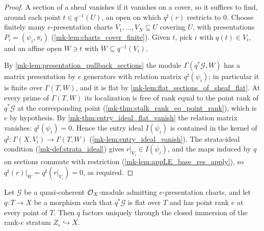 \begin{proof}
  \leanok
  A section of a sheaf vanishes if it vanishes on a cover, so it suffices to
  find, around each point \(t \in q^{-1}(U)\), an open on which
  \(q^\sharp(r)\) restricts to \(0\).  Choose finitely many
  \(e\)-presentation charts \(V_1, \dots, V_N \subseteq U\) covering \(U\),
  with presentations \(P_i = (\psi_i, \pi_i)\)
  (\ref{mk-lem:charts_cover_finite}).  Given \(t\), pick \(i\) with
  \(q(t) \in V_i\), and an affine open \(W \ni t\) with
  \(W \subseteq q^{-1}(V_i)\).

  By \ref{mk-lem:presentation_pullback_sections} the module
  \(\Gamma(q^*\mathcal G, W)\) has a matrix presentation by \(e\) generators
  with relation matrix \(q^\sharp(\psi_i)\); in particular it is finite over
  \(\Gamma(T, W)\), and it is flat by
  \ref{mk-lem:flat_sections_of_sheaf_flat}.  At every prime of
  \(\Gamma(T, W)\) its localization is free of rank equal to the point rank
  of \(q^*\mathcal G\) at the corresponding point
  (\ref{mk-thm:stalk_rank_eq_point_rank}), which is \(e\) by hypothesis.  By
  \ref{mk-thm:entry_ideal_flat_vanish} the relation matrix vanishes:
  \(q^\sharp(\psi_i) = 0\).  Hence the entry ideal \(I(\psi_i)\) is
  contained in the kernel of
  \(q^\sharp : \Gamma(X, V_i) \to \Gamma(T, W)\)
  (\ref{mk-lem:entry_ideal_vanish}).  The strata-ideal condition
  (\ref{mk-def:strata_ideal}) gives \(r|_{V_i} \in I(\psi_i)\), and the maps
  induced by \(q\) on sections commute with restriction
  (\ref{mk-lem:appLE_base_res_apply}), so
  \(q^\sharp(r)|_W = q^\sharp(r|_{V_i}) = 0\), as required.
\end{proof}

\begin{theorem}
  \label{mk-thm:stratum_lift_unique}
  \leanok

  Let \(\mathcal G\) be a quasi-coherent \(\mathcal{O}_X\)-module admitting
  \(e\)-presentation charts, and let \(q : T \to X\) be a morphism such that
  \(q^*\mathcal G\) is flat over \(T\) and has point rank \(e\) at every
  point of \(T\).  Then \(q\) factors uniquely through the closed immersion
  of the rank-\(e\) stratum \(Z_e \hookrightarrow X\).
\end{theorem}

